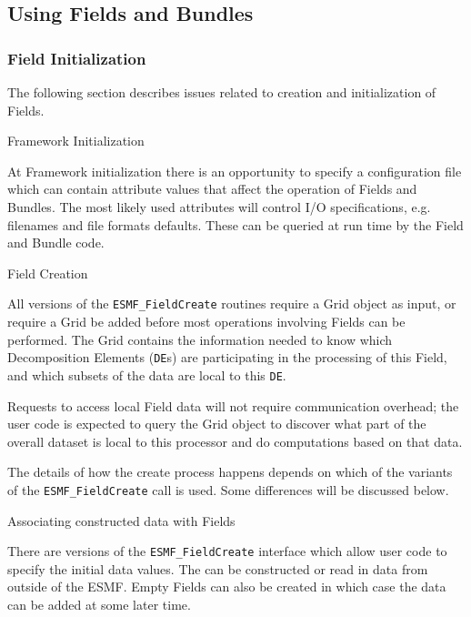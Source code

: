 \subsection{Using Fields and Bundles}

\subsubsection{Field Initialization}

The following section describes issues related to
creation and initialization of Fields.

\begin{description}

\item{Framework Initialization}
 
At Framework initialization there is an opportunity to 
specify a configuration file which can contain attribute values 
that affect the
operation of Fields and Bundles.  The most likely used
attributes will control I/O specifications, e.g. 
filenames and file formats defaults.  These can be
queried at run time by the Field and Bundle code.

\item{Field Creation}

All versions of the {\tt ESMF\_FieldCreate} 
routines require a Grid object as input, or require a Grid
be added before most operations involving Fields can be performed.
The Grid contains the information needed to know which 
Decomposition Elements ({\tt DE}s) are participating in 
the processing of this Field, and which subsets of the data
are local to this {\tt DE}.

Requests to access local Field data will not require 
communication overhead; the user code is expected to
query the Grid object to discover what part of the
overall dataset is local to this processor and do
computations based on that data.

The details of how the create process happens depends 
on which of the 
variants of the {\tt ESMF\_FieldCreate} call is used.
Some differences will be discussed below.

\item{Associating constructed data with Fields}

There are versions of the {\tt ESMF\_FieldCreate} interface
which allow user code to specify the initial data values.
The can be constructed or read in data from
outside of the ESMF.  Empty Fields can also be created in
which case the data can be added at some later time.


\end{description}
